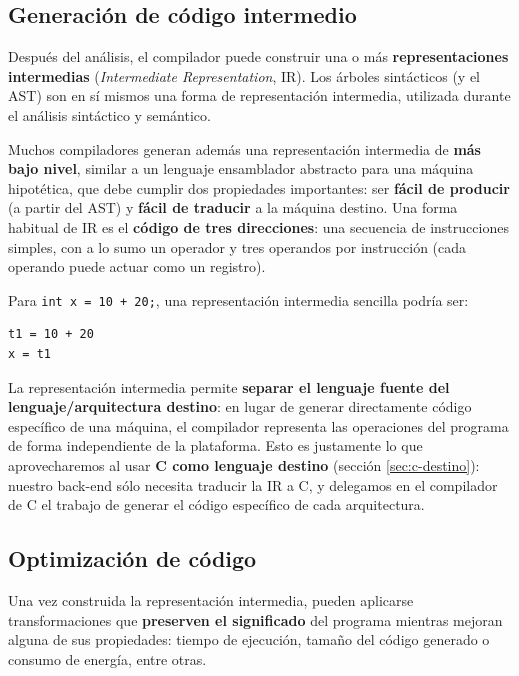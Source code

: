 \documentclass[11pt,a4paper]{article}
\begin{document}
\subsection{Generación de código intermedio}
\label{sec:codigo-intermedio}

Después del análisis, el compilador puede construir una o más \textbf{representaciones
intermedias} (\textit{Intermediate Representation}, IR). Los árboles sintácticos (y el AST) son
en sí mismos una forma de representación intermedia, utilizada durante el análisis sintáctico y
semántico.

Muchos compiladores generan además una representación intermedia de \textbf{más bajo nivel},
similar a un lenguaje ensamblador abstracto para una máquina hipotética, que debe cumplir dos
propiedades importantes: ser \textbf{fácil de producir} (a partir del AST) y \textbf{fácil de
traducir} a la máquina destino. Una forma habitual de IR es el \textbf{código de tres
direcciones}: una secuencia de instrucciones simples, con a lo sumo un operador y tres
operandos por instrucción (cada operando puede actuar como un registro).

Para \texttt{int x = 10 + 20;}, una representación intermedia sencilla podría ser:

\begin{lstlisting}
t1 = 10 + 20
x = t1
\end{lstlisting}

La representación intermedia permite \textbf{separar el lenguaje fuente del lenguaje/arquitectura
destino}: en lugar de generar directamente código específico de una máquina, el compilador
representa las operaciones del programa de forma independiente de la plataforma. Esto es
justamente lo que aprovecharemos al usar \textbf{C como lenguaje destino} (sección
\ref{sec:c-destino}): nuestro back-end sólo necesita traducir la IR a C, y delegamos en el
compilador de C el trabajo de generar el código específico de cada arquitectura.

\subsection{Optimización de código}
\label{sec:optimizacion}

Una vez construida la representación intermedia, pueden aplicarse transformaciones que
\textbf{preserven el significado} del programa mientras mejoran alguna de sus propiedades:
tiempo de ejecución, tamaño del código generado o consumo de energía, entre otras.
\end{document}

